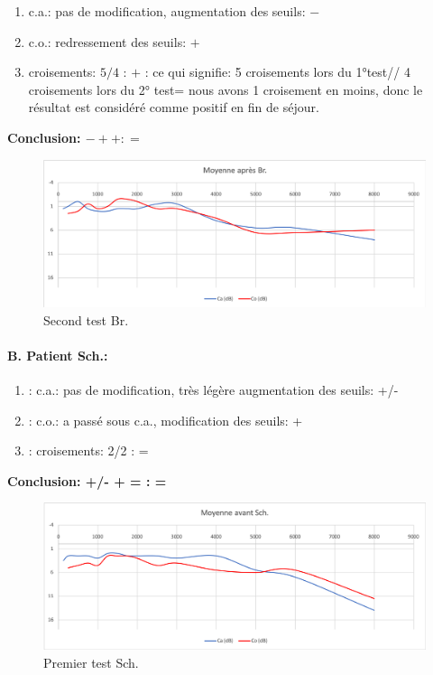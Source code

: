 	\begin{enumerate}
 		\item  c.a.: pas de modification, augmentation des
                  seuils: $-$
 		\item  c.o.: redressement des seuils: $+$
 		\item  croisements: $5/4$ : $+$ : ce qui signifie:  5 croisements lors du 1°test// 4 croisements lors du 2° test= nous avons 1 croisement en moins, donc le résultat est considéré comme positif en fin
                  de séjour.
                \end{enumerate}

             \textbf{Conclusion: $- + +   :  =$}
 \begin{figure}
\centering
\includegraphics[width=0.7\linewidth]{images/graphiques/bru_post.png}
\caption[Moyenne OG+OD]{Second test Br.}
       
\label{groupecontroleimage1}
\end{figure}





\paragraph{B. Patient Sch.:}

	\begin{enumerate}
 		
 		\item : c.a.: pas de modification, très légère augmentation des
                  seuils: +/-
 		\item : c.o.: a passé sous c.a., modification des seuils: +
 		\item : croisements: 2/2 :     =
                  
                \end{enumerate}

              \textbf{  Conclusion:  +/-    +    =        :  =}

\begin{figure}
\centering
\includegraphics[width=0.7\linewidth]{images/graphiques/schaff_pre.png}
\caption[Moyenne OG+OD]{Premier test Sch.}
       
\label{groupecontroleimage1}
\end{figure}


